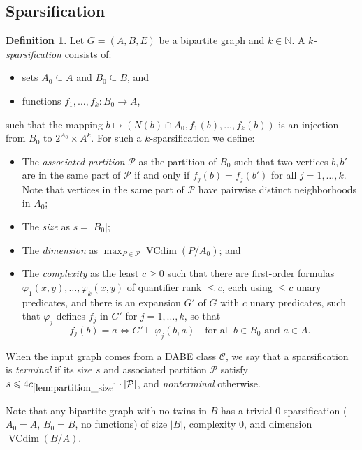 \documentclass[11pt]{article}
\theoremstyle{definition}
\newtheorem{definition}{Definition}
\newcommand{\CC}{{\mathscr C}}
\newcommand{\N}{\mathbb{N}}
\newcommand{\inducedSS}[2]{#1/#2}%
\renewcommand{\le}{\leqslant}
\renewcommand{\ge}{\geqslant}
\newcommand{\from}{\colon}
\renewcommand{\cal}{\mathcal}
\DeclareMathOperator{\VCdim}{VCdim}
\let\phi\varphi
\newcommand{\Pp}{\mathcal{P}}
\newcommand{\remph}[1]{{\color{red} \emph{#1}}}
\begin{document}
\subsection{Sparsification}

\begin{definition}
  Let $G=(A,B,E)$ be a bipartite graph and $k\in\N$.
  A \remph{$k$-sparsification} consists of:
  \begin{itemize}
    \item sets $A_0\subseteq A$ and $B_0\subseteq B$, and
    \item functions $f_1,\ldots,f_k\from B_0\to A$,
  \end{itemize}
  such that
  the mapping $b\mapsto (N(b)\cap A_0,f_1(b),\ldots,f_k(b))$ is an injection from $B_0$ to $2^{A_0} \times A^k$.
For such a $k$-sparsification we define:
\begin{itemize}
  \item The \emph{associated partition} $\cal P$ as the partition of $B_0$ such that two vertices $b,b'$ are in the same part of $\cal P$ if and only if 
  $f_j(b)=f_j(b')$ for all $j=1,\ldots,k$. Note that vertices in the same part of $\cal P$ have pairwise distinct neighborhoods in $A_0$;
  \item The \emph{size} as $s=|B_0|$;
  \item The \emph{dimension} as $\max_{P\in\cal P} \VCdim(\inducedSS{P}{A_0})$; and
  \item The \emph{complexity} as the least $c\ge0$ such that there are first-order formulas $\phi_1(x,y),\ldots,\phi_k(x,y)$ of quantifier rank ${\le}c$, each using ${\le}c$ unary predicates, and there is an expansion $G'$ of $G$ with $c$ unary predicates,
  such that $\phi_j$ defines $f_j$ in $G'$ for $j=1,\ldots,k$, so that 
  \[
    f_j(b)=a\iff G'\models \phi_j(b,a)
    \quad
    \text{for all $b\in B_0$ and $a\in A$.}  
  \]
\end{itemize}
When the input graph comes from a DABE class $\CC$, we say that a sparsification is \remph{terminal} if its size $s$ and
associated partition $\Pp$ satisfy $s\le 4 c_{\ref{lem:partition_size}} \cdot|\Pp|$, and
\remph{nonterminal} otherwise.
\end{definition}


Note that any bipartite graph with no twins in $B$ has a trivial $0$-sparsification ($A_0=A$, $B_0=B$, no functions) of size $|B|$, complexity $0$, and dimension $\VCdim(\inducedSS{B}{A})$.
\end{document}
